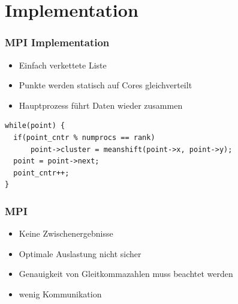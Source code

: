 \documentclass[10pt,utf8]{beamer}
\begin{document}
\section{Implementation}
\begin{frame}[fragile]
	\frametitle{MPI Implementation}
	\begin{itemize}
		\item Einfach verkettete Liste
		\item Punkte werden statisch auf Cores gleichverteilt
		\item Hauptprozess führt Daten wieder zusammen
	\end{itemize}
\normalsize
	\begin{lstlisting}
while(point) {
  if(point_cntr % numprocs == rank)
      point->cluster = meanshift(point->x, point->y);
  point = point->next;
  point_cntr++;
}
	\end{lstlisting}
\end{frame}
\Large
\begin{frame}
	\frametitle{MPI}
	\begin{itemize}
		\item Keine Zwischenergebnisse
		\item Optimale Auslastung nicht sicher
		\item Genauigkeit von Gleitkommazahlen muss beachtet werden
		\item wenig Kommunikation
	\end{itemize}
\end{frame}
\end{document}
